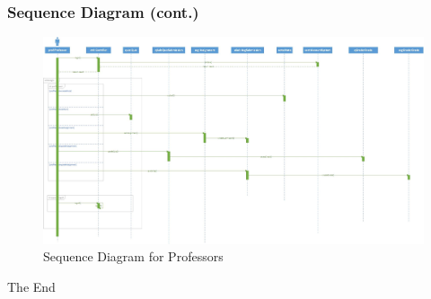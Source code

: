 \documentclass{beamer}
\begin{document}
\begin{frame}
	\frametitle{Sequence Diagram (cont.)}
	\begin{figure}[!ht]
		\begin{center}
			\includegraphics[width=\textwidth,height=\textheight,keepaspectratio]{profSeq}
		\end{center}
		\caption{Sequence Diagram for Professors}
	\end{figure}
\end{frame}

\begin{frame}
\Huge{The End}
\end{frame}

\end{document}
